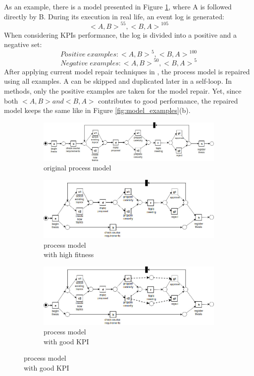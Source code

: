 As an example, there is a model presented in Figure \ref{fig:model_a}, where A is followed directly by B. During its execution in real life, an event log is generated: 
\[{ <A, B> }^{55}  , {<B, A>}^{105} \] 
When considering KPIs performance, the log is divided into a positive and a negative set: 
\[ Positive \;  examples: { <A, B> }^{5}  , {<B, A>}^{100} \] 
\[ Negative \; examples: { <A, B> }^{50}  , {<B, A>}^{5} \]  
After applying current model repair techniques in \cite{fahland2015model}, the process model is repaired using all examples. A can be skipped and duplicated later in a self-loop. In \cite{dees2017enhancing} methods, only the positive examples are taken for the model repair. Yet, since both $<A,B> and <B,A>$ contributes to good performance,  the repaired model keeps the same like in Figure \ref{fig:model_examples}(b).
\begin{figure}[h]
	\centering
	\begin{subfigure}[b]{\textwidth}
		\centering
		\includegraphics[width=\linewidth]{figures/introduction/Thesis-PN-Example-original-model.jpg}
		\caption{original process model}
		\label{fig:model_a}
	\end{subfigure}
	\hfill
	\begin{subfigure}[b]{\textwidth}
		\centering
		\includegraphics[width=\linewidth]{figures/introduction/Thesis-PN-Example-model-with-fitness.jpg}
		\caption{process model \\ with high fitness}
		\label{fig:model_b}
	\end{subfigure}
	\hfill
	\begin{subfigure}[b]{\textwidth}
		\centering
		\includegraphics[width=01.0\linewidth]{figures/introduction/Thesis-PN-Example-model-with-lt-1.jpg}
		\caption{process model \\ with good KPI}
		\label{fig:model_c}
	\end{subfigure}
	

\end{figure}
